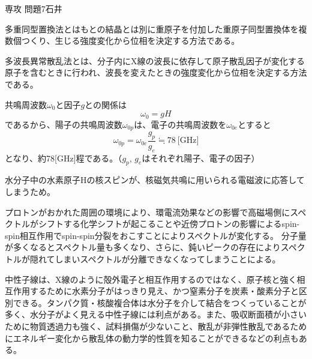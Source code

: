 \documentclass[fleqn]{jbook}
\begin{document}
\begin{answer}{専攻 問題7}{石井}
\begin{subanswers}
\begin{subsubanswers}
多重同型置換法とはもとの結晶とは別に重原子を付加した重原子同型置換体を複数個つくり、生じる強度変化から位相を決定する方法である。

多波長異常散乱法とは、分子内にX線の波長に依存して原子散乱因子が変化する原子を含むときに行われ、波長を変えたときの強度変化から位相を決定する方法である。
\end{subsubanswers}

\SubAnswer
\begin{subsubanswers}
\SubSubAnswer
共鳴周波数$\omega_0$と因子$g$との関係は
\[   \omega_0 = g H  \]
であるから、陽子の共鳴周波数$\omega_{0p}$は、電子の共鳴周波数を$\omega_{0e}$とすると
\[  \omega_{0p} = \omega_{0e} \frac{g_{p}}{g_{e}}\fallingdotseq 78~\text{[GHz]}  \]
となり、約78[GHz]程である。（$g_{p}$, $g_{e}$はそれぞれ陽子、電子の因子）

\SubSubAnswer
水分子中の水素原子Hの核スピンが、核磁気共鳴に用いられる電磁波に応答してしまうため。

\SubSubAnswer
プロトンがおかれた周囲の環境により、環電流効果などの影響で高磁場側にスペクトルがシフトする化学シフトが起こることや近傍プロトンの影響によるspin-spin相互作用でspin-spin分裂をおこすことによりスペクトルが変化する。
\SubSubAnswer 分子量が多くなるとスペクトル量も多くなり、さらに、鈍いピークの存在によりスペクトルが隠れてしまいスペクトルが分離できなくなってしまうことによる。
\end{subsubanswers}

\SubAnswer
中性子線は、X線のように殻外電子と相互作用するのではなく、原子核と強く相互作用するために水素分子がはっきり見え、かつ窒素分子を炭素・酸素分子と区別できる。タンパク質・核酸複合体は水分子を介して結合をつくっていることが多く、水分子がよく見える中性子線には利点がある。また、吸収断面積が小さいために物質透過力も強く、試料損傷が少ないこと、散乱が非弾性散乱であるためにエネルギー変化から散乱体の動力学的性質を知ることができるなどの利点もある。
\end{subanswers}
\end{answer}
\end{document}
